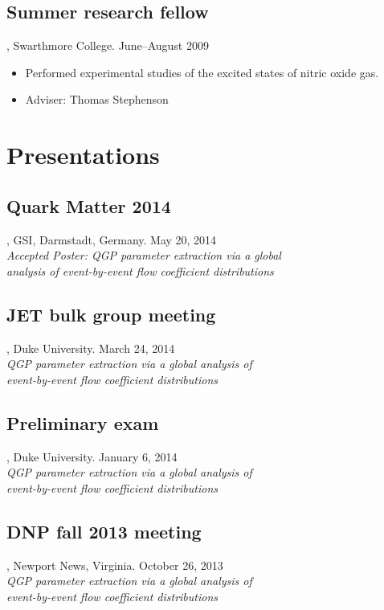 \documentclass[letterpaper,10pt]{article}
\begin{document}
\subsection{Summer research fellow}, Swarthmore College. \hfill June--August 2009

\begin{itemize}
  \item Performed experimental studies of the excited states of nitric oxide gas.
  \item Adviser:  Thomas Stephenson
\end{itemize}



\pagebreak


\section{Presentations}

\subsection{Quark Matter 2014}, GSI, Darmstadt, Germany. \hfill May 20, 2014 \\
\emph{Accepted Poster: QGP parameter extraction via a global \\ analysis of event-by-event flow coefficient distributions}


\subsection{JET bulk group meeting}, Duke University. \hfill March 24, 2014 \\
\emph{QGP parameter extraction via a global analysis of \\ event-by-event flow coefficient distributions}


\subsection{Preliminary exam}, Duke University. \hfill January 6, 2014 \\
\emph{QGP parameter extraction via a global analysis of \\ event-by-event flow coefficient distributions}


\subsection{DNP fall 2013 meeting}, Newport News, Virginia. \hfill October 26, 2013 \\
\emph{QGP parameter extraction via a global analysis of \\ event-by-event flow coefficient distributions}
\end{document}
